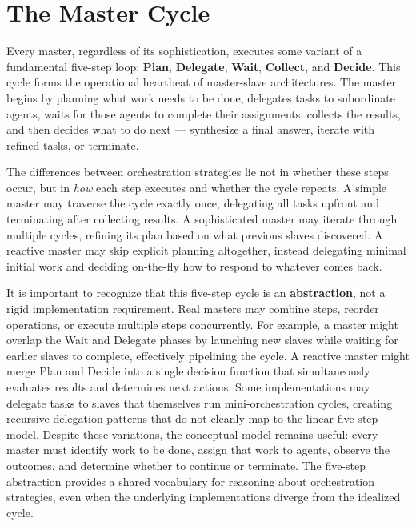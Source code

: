 
\section{The Master Cycle}\label{sec:orch_cycle}

Every master, regardless of its sophistication, executes some variant of a fundamental five-step loop: \textbf{Plan}, \textbf{Delegate}, \textbf{Wait}, \textbf{Collect}, and \textbf{Decide}. This cycle forms the operational heartbeat of master-slave architectures. The master begins by planning what work needs to be done, delegates tasks to subordinate agents, waits for those agents to complete their assignments, collects the results, and then decides what to do next — synthesize a final answer, iterate with refined tasks, or terminate.

The differences between orchestration strategies lie not in whether these steps occur, but in \emph{how} each step executes and whether the cycle repeats. A simple master may traverse the cycle exactly once, delegating all tasks upfront and terminating after collecting results. A sophisticated master may iterate through multiple cycles, refining its plan based on what previous slaves discovered. A reactive master may skip explicit planning altogether, instead delegating minimal initial work and deciding on-the-fly how to respond to whatever comes back.

It is important to recognize that this five-step cycle is an \textbf{abstraction}, not a rigid implementation requirement. Real masters may combine steps, reorder operations, or execute multiple steps concurrently. For example, a master might overlap the Wait and Delegate phases by launching new slaves while waiting for earlier slaves to complete, effectively pipelining the cycle. A reactive master might merge Plan and Decide into a single decision function that simultaneously evaluates results and determines next actions. Some implementations may delegate tasks to slaves that themselves run mini-orchestration cycles, creating recursive delegation patterns that do not cleanly map to the linear five-step model. Despite these variations, the conceptual model remains useful: every master must identify work to be done, assign that work to agents, observe the outcomes, and determine whether to continue or terminate. The five-step abstraction provides a shared vocabulary for reasoning about orchestration strategies, even when the underlying implementations diverge from the idealized cycle.


